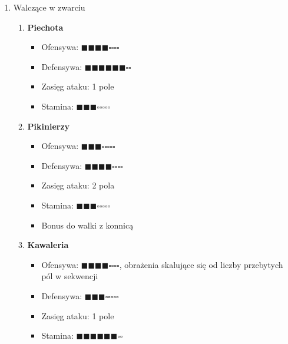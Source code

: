 \documentclass[oneside]{lmdEN}%
\begin{document}
\begin{enumerate}
    \item Walczące w zwarciu
          \begin{enumerate}
              \item \textbf{Piechota}
                    \begin{itemize}
                        \item Ofensywa: $\blacksquare\blacksquare\blacksquare\blacksquare\square\square\square\square$
                        \item Defensywa: $\blacksquare\blacksquare\blacksquare\blacksquare\blacksquare\blacksquare\square\square$
                        \item Zasięg ataku: 1 pole
                        \item Stamina: $\blacksquare\blacksquare\blacksquare\square\square\square\square\square$
                    \end{itemize}
              \item \textbf{Pikinierzy}
                    \begin{itemize}
                        \item Ofensywa: $\blacksquare\blacksquare\blacksquare\square\square\square\square\square$
                        \item Defensywa: $\blacksquare\blacksquare\blacksquare\blacksquare\square\square\square\square$
                        \item Zasięg ataku: 2 pola
                        \item Stamina: $\blacksquare\blacksquare\blacksquare\square\square\square\square\square$
                        \item Bonus do walki z konnicą
                    \end{itemize}
              \item \textbf{Kawaleria}
                    \begin{itemize}
                        \item Ofensywa: $\blacksquare\blacksquare\blacksquare\blacksquare\square\square\square\square$, obrażenia skalujące się od liczby przebytych pól w sekwencji
                        \item Defensywa: $\blacksquare\blacksquare\blacksquare\square\square\square\square\square$
                        \item Zasięg ataku: 1 pole
                        \item Stamina: $\blacksquare\blacksquare\blacksquare\blacksquare\blacksquare\blacksquare\square\square$

\end{itemize}
\end{enumerate}
\end{enumerate}
\end{document}
